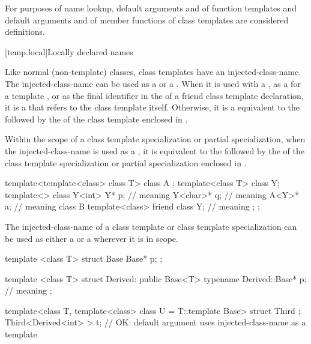 \pnum
\begin{note}
For purposes of name lookup, default arguments and
 of function templates and default
arguments and  of
member functions of class templates are considered definitions.
\end{note}

[temp.local]{Locally declared names}

\pnum
Like normal (non-template) classes, class templates have an
injected-class-name.
The
injected-class-name can be used
as a  or a .
When it is used with a
,
as a  for a template ,
or as the final identifier in the  of
a friend class template declaration,
it is a  that refers to the
class template itself.
Otherwise, it is a 
equivalent to the 
followed by the  of the class template
enclosed in \tcode{<>}.

\pnum
Within the scope of a class template specialization or
partial specialization, when the injected-class-name is
used as a ,
it is equivalent to the  followed by the
of the class template specialization or partial
specialization enclosed in
\tcode{<>}.
\begin{example}
\begin{codeblock}
template<template<class> class T> class A { };
template<class T> class Y;
template<> class Y<int> {
  Y* p;                                 // meaning 
  Y<char>* q;                           // meaning 
  A<Y>* a;                              // meaning 
  class B {
    template<class> friend class Y;     // meaning 
  };
};
\end{codeblock}
\end{example}

\pnum
The injected-class-name of a class template or class
template specialization can be used as either
a  or a 
wherever it is in scope.
\begin{example}
\begin{codeblock}
template <class T> struct Base {
  Base* p;
};

template <class T> struct Derived: public Base<T> {
  typename Derived::Base* p;            // meaning 
};

template<class T, template<class> class U = T::template Base> struct Third { };
Third<Derived<int> > t;                 // OK: default argument uses injected-class-name as a template
\end{codeblock}
\end{example}

